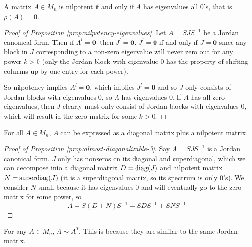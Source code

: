 \begin{proposition}
\label{prop:nilpotency-eigenvalues}
A matrix $A \in M_n$ is nilpotent if and only if $A$ has eigenvalues all 0's, that is $\rho(A) = 0$.
\end{proposition}

\begin{proof}[Proof of Proposition \ref{prop:nilpotency-eigenvalues}]
Let $A = SJS^{-1}$ be a Jordan canonical form. Then if $A^l = \mathbf{0}$, then $J^l = \mathbf{0}$. $J^l = \mathbf{0}$ if and only if $J = \mathbf{0}$ since any block in $J$ corresponding to a non-zero eigenvalue will never zero out for any power $k > 0$ (only the Jordan block with eigenvalue 0 has the property of shifting columns up by one entry for each power). 

So nilpotency implies $A^l = \mathbf{0}$, which implies $J^l = \mathbf{0}$ and so $J$ only consists of Jordan blocks with eigenvalues 0, so $A$ has eigenvalues 0. If $A$ has all zero eigenvalues, then $J$ clearly must only consist of Jordan blocks with eigenvalues 0, which will result in the zero matrix for some $k > 0$.
\end{proof}

\begin{proposition}
\label{prop:almost-diagonalizable-3}
For all $A \in M_n$, $A$ can be expressed as a diagonal matrix plus a nilpotent matrix.
\end{proposition}

\begin{proof}[Proof of Proposition \ref{prop:almost-diagonalizable-3}]
Say $A = SJS^{-1}$ is a Jordan canonical form. $J$ only has nonzeros on its diagonal and superdiagonal, which we can decompose into a diagonal matrix $D = \operatorname{diag}(J)$ and nilpotent matrix $N = \operatorname{superdiag}(J)$ (it is a superdiagonal matrix, so its spectrum is only 0's). We consider $N$ small because it has eigenvalues 0 and will eventually go to the zero matrix for some power, so
$$
A = S(D+N)S^{-1} = SDS^{-1} + SNS^{-1}
$$
\end{proof}

\begin{corollary}
\label{cor:jordan-transpose-similar}
For any $A \in M_n$, $A \sim A^T$. This is because they are similar to the same Jordan matrix.
\end{corollary}

